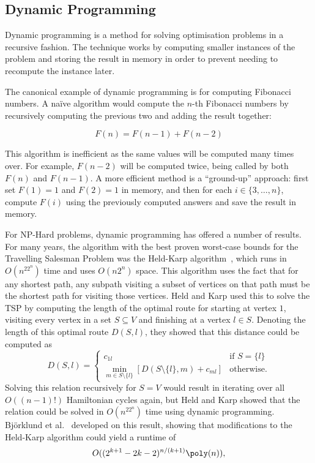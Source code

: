 \subsection{Dynamic Programming}

Dynamic programming is a method for solving optimisation problems in a recursive fashion. The technique works by computing smaller instances of the problem and storing the result in memory in order to prevent needing to recompute the instance later.

The canonical example of dynamic programming is for computing Fibonacci numbers. A na\"{i}ve algorithm would compute the $n$-th Fibonacci numbers by recursively computing the previous two and adding the result together:

$$F(n) = F(n-1) + F(n-2)$$

This algorithm is inefficient as the same values will be computed many times over. For example, $F(n-2)$ will be computed twice, being called by both $F(n)$ and $F(n-1)$. A more efficient method is a ``ground-up'' approach: first set $F(1)=1$ and $F(2)=1$ in memory, and then for each $i \in \{3,\dots,n\}$, compute $F(i)$ using the previously computed answers and save the result in memory.

For NP-Hard problems, dynamic programming has offered a number of results. For many years, the algorithm with the best proven worst-case bounds for the Travelling Salesman Problem was the Held-Karp algorithm~\cite{held1962}, which runs in $O(n^22^n)$ time and uses $O(n2^n)$ space. This algorithm uses the fact that for any shortest path, any subpath visiting a subset of vertices on that path must be the shortest path for visiting those vertices. Held and Karp used this to solve the TSP by computing the length of the optimal route for starting at vertex $1$, visiting every vertex in a set $S \subseteq V$ and finishing at a vertex $l \in S$. Denoting the length of this optimal route $D(S, l)$, they showed that this distance could be computed as
%
\begin{equation}
D(S, l) = \begin{cases} c_{1l} & \text{if } S = \{l\}\\
          \min_{m \in S \setminus \{l\}}\left[D(S \setminus \{l\}, m) + c_{ml}\right] & \text{otherwise.}
  \end{cases}
\end{equation}
%
Solving this relation recursively for $S=V$ would result in iterating over all $O((n-1)!)$ Hamiltonian cycles again, but Held and Karp showed that the relation could be solved in $O(n^22^n)$ time using dynamic programming. Bj{\"o}rklund et al.\ \cite{bjorklund2008} developed on this result, showing that modifications to the Held-Karp algorithm could yield a runtime of
%
\begin{equation}
O((2^{k + 1} - 2k - 2)^{n/(k + 1)}\poly(n)),
\end{equation}

